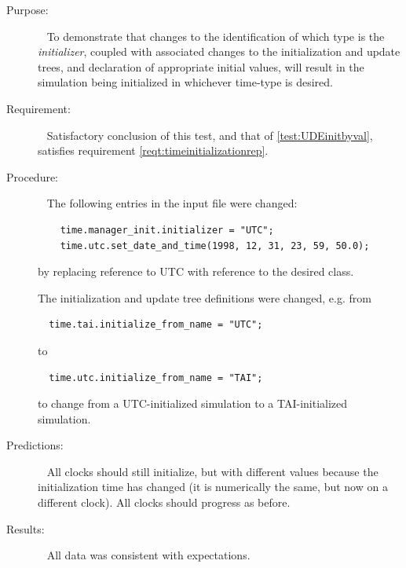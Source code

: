   \label{test:STDinitbytype}
\begin{description}
\item[Purpose:]\ \newline
To demonstrate that changes to the identification of which type is the \textit{initializer}, coupled with associated changes to the initialization and update trees, and declaration of appropriate initial values, will result in the simulation being initialized in whichever time-type is desired.

\item[Requirement:]\ \newline
Satisfactory conclusion of this test, and that of \ref{test:UDEinitbyval}, satisfies requirement \ref{reqt:timeinitializationrep}.

\item[Procedure:]\ \newline
The following entries in the input file were changed:
\begin{verbatim}
	time.manager_init.initializer = "UTC";
	time.utc.set_date_and_time(1998, 12, 31, 23, 59, 50.0);
\end{verbatim}
by replacing reference to UTC with reference to the desired class.

The initialization and update tree definitions were changed, e.g. from
\begin{verbatim}
  time.tai.initialize_from_name = "UTC";
\end{verbatim}
to
\begin{verbatim}
  time.utc.initialize_from_name = "TAI";
\end{verbatim}
to change from a UTC-initialized simulation to a TAI-initialized simulation.

\item[Predictions:]\ \newline
All clocks should still initialize, but with different values because the initialization time has changed (it is numerically the same, but now on a different clock).
All clocks should progress as before.

\item[Results:]\ \newline
All data was consistent with expectations.

\end{description}




